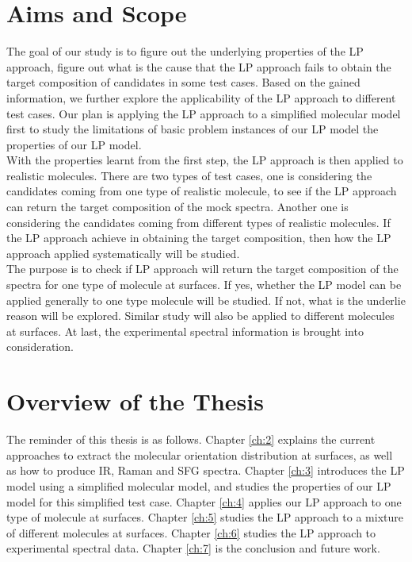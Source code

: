 \section{Aims and Scope}
The goal of our study is to figure out the underlying properties of the LP approach, figure out what is the cause that the LP approach fails to obtain the target composition of candidates in some test cases. Based on the gained information, we further explore the applicability of the LP approach to different test cases. Our plan is applying the LP approach to a simplified molecular model first to study the limitations of basic problem instances of our LP model the properties of our LP model. \\

With the properties learnt from the first step, the LP approach is then applied to realistic molecules. There are two types of test cases, one is considering the candidates coming from one type of realistic molecule, to see if the LP approach can return the target composition of the mock spectra. Another one is considering the candidates coming from different types of realistic molecules. If the LP approach achieve in obtaining the target composition, then how the LP approach applied systematically will be studied. \\

The purpose is to check if LP approach will return the target composition of the spectra for one type of molecule at surfaces. If yes, whether the LP model can be applied generally to one type molecule will be studied. If not, what is the underlie reason will be explored. Similar study will also be applied to different molecules at surfaces. At last, the experimental spectral information is brought into consideration. \\

\section{Overview of the Thesis}
The reminder of this thesis is as follows. Chapter \ref{ch:2} explains the current approaches to extract the molecular orientation distribution at surfaces, as well as how to produce IR, Raman and SFG spectra. Chapter \ref{ch:3} introduces the LP model using a simplified molecular model, and studies the properties of our LP model for this simplified test case. Chapter \ref{ch:4} applies our LP approach to one type of molecule at surfaces. Chapter \ref{ch:5} studies the LP approach to a mixture of different molecules at surfaces. Chapter \ref{ch:6} studies the LP approach to experimental spectral data. Chapter \ref{ch:7} is the conclusion and future work.
